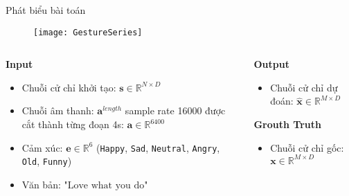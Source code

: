 \begin{frame}{Phát biểu bài toán}


 \begin{figure}[h]
	\centering
	\texttt{[image: GestureSeries]}
\end{figure}

\vspace{-10pt}

\begin{columns}
	
	\begin{column}{0.6\textwidth}
		
		\textbf{Input}
		\begin{itemize}
			\item Chuỗi cử chỉ khởi tạo: $\mathbf{s} \in \mathbb{R}^{N \times D}$
			\item Chuỗi âm thanh: $\mathbf{a}^{length}$ sample rate 16000 được cắt thành từng đoạn 4s: $\mathbf{a} \in \mathbb{R}^{6400}$
			\item Cảm xúc: $\mathbf{e} \in \mathbb{R}^6$ (\texttt{Happy},  \texttt{Sad},  \texttt{Neutral}, \texttt{Angry}, \texttt{Old}, \texttt{Funny})
			\item Văn bản: $\text{"Love what you do"}$
		\end{itemize}
		
	\end{column}
	\begin{column}{0.4\textwidth}
		 \textbf{Output}
		 \begin{itemize}
		 	\item Chuỗi cử chỉ dự đoán: $\hat{\mathbf{x}} \in \mathbb{R}^{M \times D}$
		 \end{itemize}
		 
		 \textbf{Grouth Truth}
		 \begin{itemize}
		 	\item Chuỗi cử chỉ gốc: $ \mathbf{x}  \in \mathbb{R}^{M \times D}$
		 \end{itemize}
	\end{column}
\end{columns}

\end{frame}

